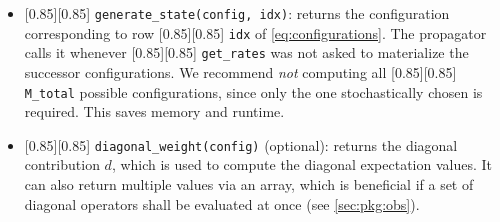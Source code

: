 \documentclass{SciPost}
\newcommand{\pyinline}[1]{\begingroup\setlength{\fboxsep}{0pt}%
  \colorbox{gray!15}{\raisebox{0pt}[0.85\ht\strutbox][0.85\dp\strutbox]{%
    \hspace{1pt}\lstinline{#1}\hspace{1pt}}}\endgroup}
\begin{document}
\begin{itemize}
	\item \pyinline{generate_state(config, idx)}: returns the configuration corresponding to row \pyinline{idx} of \autoref{eq:configurations}.
		The propagator calls it whenever \pyinline{get_rates} was not asked to materialize the successor configurations.
		We recommend \emph{not} computing all \pyinline{M_total} possible configurations, since only the one stochastically chosen is required.
		This saves memory and runtime.

\item \pyinline{diagonal_weight(config)} (optional): returns the diagonal contribution $d$, which is used to compute the diagonal expectation values.
		It can also return multiple values via an array, which is beneficial if a set of diagonal operators shall be evaluated at once (see \autoref{sec:pkg:obs}).
\end{itemize}
\end{document}
